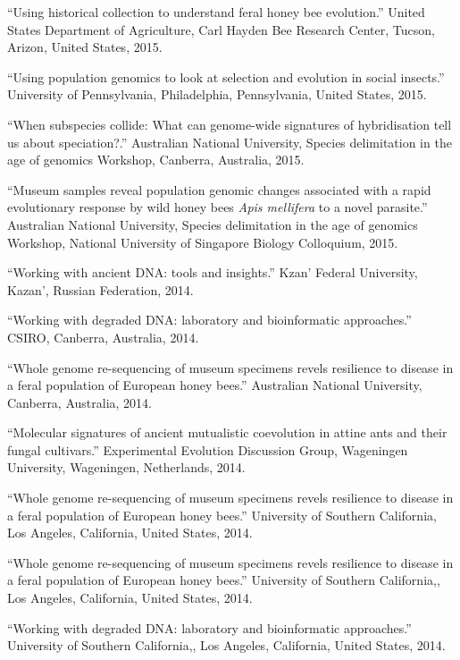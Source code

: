 \documentclass[11pt]{article}
\def\printdate#1{\xprintdate#1-}
\def\xprintdate#1-#2-#3-{#1}
\begin{document}
\ind ``Using historical collection to understand feral honey bee
evolution.'' United States Department of Agriculture, Carl Hayden Bee
Research Center, Tucson, Arizon, United States, \printdate{2015-00-00}.


\ind ``Using population genomics to look at selection and evolution in
social insects.'' University of Pennsylvania, Philadelphia,
Pennsylvania, United States, \printdate{2015-00-00}.


\ind ``When subspecies collide: What can genome-wide signatures of
hybridisation tell us about speciation?.'' Australian National
University, Species delimitation in the age of genomics
Workshop, Canberra, Australia, \printdate{2015-00-00}.


\ind ``Museum samples reveal population genomic changes associated with
a rapid evolutionary response by wild honey bees \textit{Apis mellifera}
to a novel parasite.'' Australian National University, Species
delimitation in the age of genomics Workshop, National University of
Singapore Biology Colloquium, \printdate{2015-00-00}.


\ind ``Working with ancient DNA: tools and insights.'' Kzan' Federal
University, Kazan', Russian Federation, \printdate{2014-00-00}.


\ind ``Working with degraded DNA: laboratory and bioinformatic
approaches.'' CSIRO, Canberra, Australia, \printdate{2014-00-00}.


\ind ``Whole genome re-sequencing of museum specimens revels resilience
to disease in a feral population of European honey bees.'' Australian
National University, Canberra, Australia, \printdate{2014-00-00}.



\ind ``Molecular signatures of ancient mutualistic coevolution in attine
ants and their fungal cultivars.'' Experimental Evolution Discussion
Group, Wageningen University, Wageningen,
Netherlands, \printdate{2014-00-00}.


\ind ``Whole genome re-sequencing of museum specimens revels resilience
to disease in a feral population of European honey bees.'' University of
Southern California, Los Angeles, California, United
States, \printdate{2014-00-00}.


\ind ``Whole genome re-sequencing of museum specimens revels resilience
to disease in a feral population of European honey bees.'' University of
Southern California,, Los Angeles, California, United
States, \printdate{2014-00-00}.


\ind ``Working with degraded DNA: laboratory and bioinformatic
approaches.'' University of Southern California,, Los Angeles,
California, United States, \printdate{2014-00-00}.
\end{document}
